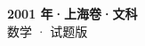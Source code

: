 \documentclass[zihao=-4, a4paper]{ctexart}
\begin{document}
\begin{center}
  {\Large\bfseries 2001 年·上海卷·文科}\\[4pt]
  {\large 数学 · 试题版}
\end{center}
\medskip
{}

\end{document}
